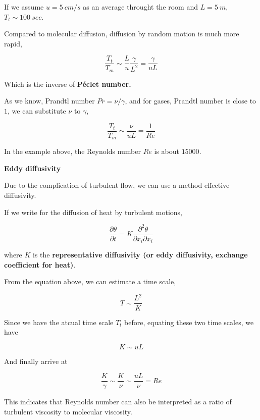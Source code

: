 If we assume $u=5\ cm/s$ as an average throught the room and $L=5\ m$, $T_t\sim 100\ sec$.

Compared to molecular diffusion, diffusion by random motion is much more rapid,

\begin{equation*}
    \frac{T_t}{T_m}\sim\frac{L}{u}\frac{\gamma}{L^2}=\frac{\gamma}{uL}
\end{equation*}

Which is the inverse of \textbf{P\'eclet number.}

As we know, Prandtl number $Pr=\nu/\gamma$, and for gases, Prandtl number is close to $1$, we can substitute $\nu$ to $\gamma$,

\begin{equation*}
    \frac{T_t}{T_m}\sim\frac{\nu}{uL}=\frac{1}{Re}
\end{equation*}

In the example above, the Reynolds number $Re$ is about $15000$.

\textbf{Eddy diffusivity}

Due to the complication of turbulent flow, we can use a method effective diffusivity.

If we write for the diffusion of heat by turbulent motions,

\begin{equation*}
    \frac{\partial\theta}{\partial t}=K\frac{\partial^2\theta}{\partial x_i\partial x_i}
\end{equation*}

where $K$ is the \textbf{representative diffusivity (or eddy diffusivity, exchange coefficient for heat)}.

From the equation above, we can estimate a time scale,

\begin{equation*}
    T\sim\frac{L^2}{K}
\end{equation*}

Since we have the atcual time scale $T_t$ before, equating these two time scales, we have

\begin{equation*}
    K\sim uL
\end{equation*}

And finally arrive at

\begin{equation*}
    \frac{K}{\gamma}\sim\frac{K}{\nu}\sim\frac{uL}{\nu}=Re
\end{equation*}

This indicates that Reynolds number can also be interpreted as a ratio of turbulent viscosity to molecular viscosity.

